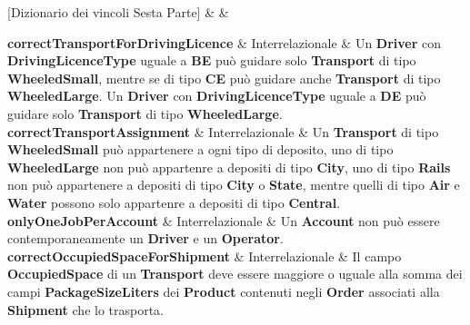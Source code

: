 [Dizionario dei vincoli Sesta Parte]{ &  & }{
    
  \textbf{correctTransportForDrivingLicence} & Interrelazionale &
  {\footnotesize
  Un \textbf{Driver} con \textbf{DrivingLicenceType} uguale a \textbf{BE} può guidare solo \textbf{Transport} di tipo \textbf{WheeledSmall}, mentre se di tipo \textbf{CE} può guidare anche \textbf{Transport} di tipo \textbf{WheeledLarge}. Un \textbf{Driver} con \textbf{DrivingLicenceType} uguale a \textbf{DE} può guidare solo \textbf{Transport} di tipo \textbf{WheeledLarge}.
  }\\

  \textbf{correctTransportAssignment} & Interrelazionale &
  {\footnotesize
  Un \textbf{Transport} di tipo \textbf{WheeledSmall} può appartenere a ogni tipo di deposito, uno di tipo \textbf{WheeledLarge} non può appartenre a depositi di tipo \textbf{City}, uno di tipo \textbf{Rails} non può appartenere a depositi di tipo \textbf{City} o \textbf{State}, mentre quelli di tipo \textbf{Air} e \textbf{Water} possono solo appartenre a depositi di tipo \textbf{Central}.
  }\\

  \textbf{onlyOneJobPerAccount} & Interrelazionale &
  {\footnotesize
  Un \textbf{Account} non può essere contemporaneamente un \textbf{Driver} e un \textbf{Operator}.
  }\\

  \textbf{correctOccupiedSpaceForShipment} & Interrelazionale &
  {\footnotesize
  Il campo \textbf{OccupiedSpace} di un \textbf{Transport} deve essere maggiore o uguale alla somma dei campi \textbf{PackageSizeLiters} dei \textbf{Product} contenuti negli \textbf{Order} associati alla \textbf{Shipment} che lo trasporta.
  }\\

}